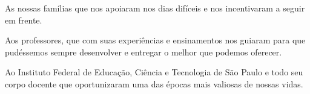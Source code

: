 \begin{agradecimentos}

As nossas famílias que nos apoiaram nos dias difíceis e nos incentivaram a seguir em frente.

Aos professores, que com suas experiências e ensinamentos nos guiaram para que pudéssemos sempre desenvolver e entregar o melhor que podemos oferecer.

Ao Instituto Federal de Educação, Ciência e Tecnologia de São Paulo e todo seu corpo docente que oportunizaram uma das épocas mais valiosas de nossas vidas.
\end{agradecimentos}
